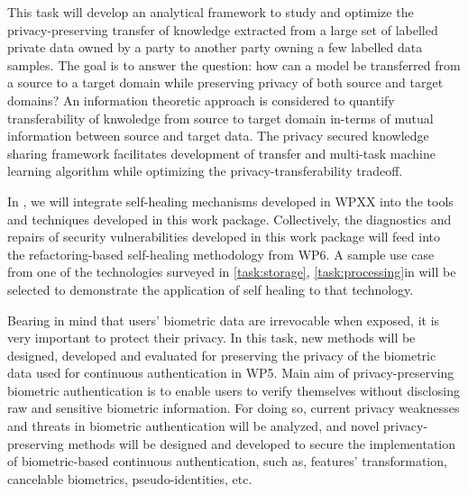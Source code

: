 \begin{Workpackage}{\thewpno}
 \begin{Task}
  
  \TaskResults{%
  }
  \TaskHeader{}
  This task will develop an analytical framework to study and optimize the privacy-preserving transfer of knowledge extracted from a large set of labelled private data owned by a party to another party owning a few labelled data samples. The goal is to answer the question: how can a model be transferred from a source to a target domain while preserving privacy of both source and target domains? An information theoretic approach is considered to quantify transferability of knwoledge from source to target domain in-terms of mutual information between source and target data. The privacy secured knowledge sharing framework facilitates development of transfer and multi-task machine learning algorithm while optimizing the privacy-transferability tradeoff.
 \end{Task}

 \begin{Task}
  
  \TaskResults{%
  }
  \TaskHeader{}
  In \theTask, we will integrate self-healing mechanisms developed in WPXX into the tools and techniques developed in this work package. Collectively, the diagnostics and repairs of security vulnerabilities developed in this work package will feed into the refactoring-based self-healing methodology from WP6. A sample use case from one of the technologies surveyed in \ref{task:storage}, \ref{task:processing}in  will be selected to demonstrate the application of self healing to that technology. 
 \end{Task}
 
 
 \begin{Task}
  
  \TaskResults{%
  }
  \TaskHeader{}
  Bearing in mind that users' biometric data are irrevocable when exposed, it is very important to protect their privacy. In this task, new methods will be designed, developed and evaluated for preserving the privacy of the biometric data used for continuous authentication in WP5. Main aim of privacy-preserving biometric authentication is to enable users to verify themselves without disclosing raw and sensitive biometric information. For doing so, current privacy weaknesses and threats in biometric authentication will be analyzed, and novel privacy-preserving methods will be designed and developed to secure the implementation of biometric-based continuous authentication, such as, features' transformation, cancelable biometrics, pseudo-identities, etc.
 \end{Task}
 

\end{Workpackage}
